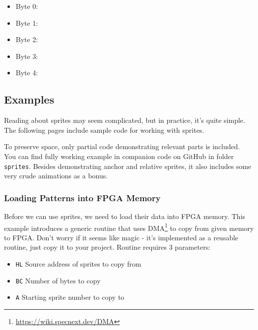 \begin{itemize}[topsep=1pt,itemsep=1pt]
	\item Byte 0: 
	\item Byte 1: 
	\item Byte 2: 
	\item Byte 3: 
	\item Byte 4: 
\end{itemize}


\subsection{Examples}

Reading about sprites may seem complicated, but in practice, it's quite simple. The following pages include sample code for working with sprites.

To preserve space, only partial code demonstrating relevant parts is included. You can find fully working example in companion code on GitHub in folder {\tt sprites}. Besides demonstrating anchor and relative sprites, it also includes some very crude animations as a bonus.


\pagebreak
\subsubsection{Loading Patterns into FPGA Memory}

Before we can use sprites, we need to load their data into FPGA memory. This example introduces a generic routine that uses DMA\footnote{\url{https://wiki.specnext.dev/DMA}} to copy from given memory to FPGA. Don't worry if it seems like magic - it's implemented as a reusable routine, just copy it to your project. Routine requires 3 parameters:

\begin{itemize}[topsep=1pt,itemsep=1pt]
	\item {\tt HL} Source address of sprites to copy from
	\item {\tt BC} Number of bytes to copy
	\item {\tt A} Starting sprite number to copy to
\end{itemize}

